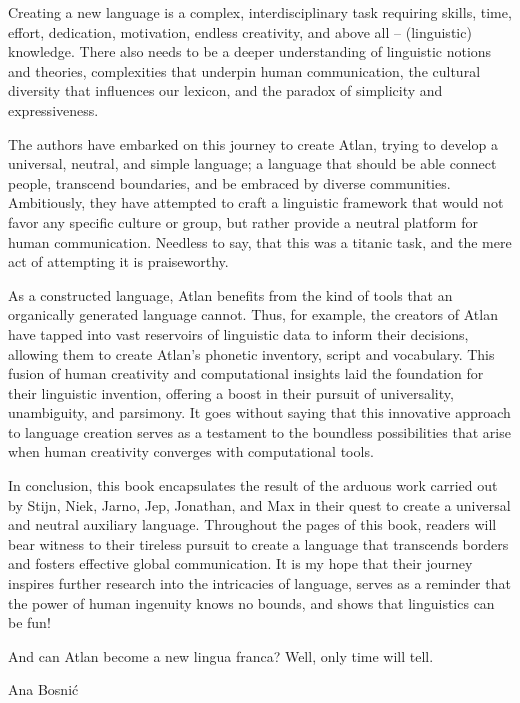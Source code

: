 Creating a new language is a complex, interdisciplinary task requiring skills, time, effort, dedication, motivation, endless creativity, and above all – (linguistic) knowledge. There also needs to be a deeper understanding of linguistic notions and theories, complexities that underpin human communication, the cultural diversity that influences our lexicon, and the paradox of simplicity and expressiveness.  

The authors have embarked on this journey to create Atlan, trying to develop a universal, neutral, and simple language; a language that should be able connect people, transcend boundaries, and be embraced by diverse communities. Ambitiously, they have attempted to craft a linguistic framework that would not favor any specific culture or group, but rather provide a neutral platform for human communication. Needless to say, that this was a titanic task, and the mere act of attempting it is praiseworthy.  

 As a constructed language, Atlan benefits from the kind of tools that an organically generated language cannot. Thus, for example, the creators of Atlan have tapped into vast reservoirs of linguistic data to inform their decisions, allowing them to create Atlan’s phonetic inventory, script and vocabulary. This fusion of human creativity and computational insights laid the foundation for their linguistic invention, offering a boost in their pursuit of universality, unambiguity, and parsimony. It goes without saying that this innovative approach to language creation serves as a testament to the boundless possibilities that arise when human creativity converges with computational tools.  

In conclusion, this book encapsulates the result of the arduous work carried out by Stijn, Niek, Jarno, Jep, Jonathan, and Max in their quest to create a universal and neutral auxiliary language. Throughout the pages of this book, readers will bear witness to their tireless pursuit to create a language that transcends borders and fosters effective global communication. It is my hope that their journey inspires further research into the intricacies of language, serves as a reminder that the power of human ingenuity knows no bounds, and shows that linguistics can be fun!  

And can Atlan become a new lingua franca? Well, only time will tell. 



\hfill Ana Bosni\'{c}
